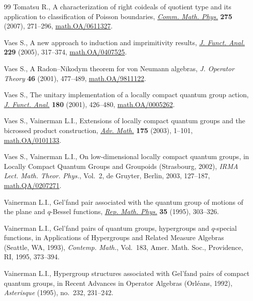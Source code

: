 \documentclass[pdftex]{sigma}
\numberwithin{equation}{section}
\theoremstyle{definition}
\begin{document}
\begin{thebibliography}{99}
 Tomatsu  R.,
  A characterization of right coideals of quotient type and its application to classif\/ication of Poisson boundaries,
\href{http://dx.doi.org/10.1007/s00220-007-0267-6}{\emph{Comm. Math. Phys.}} {\bf 275} (2007), 271--296,
\href{http://arxiv.org/abs/math.OA/0611327}{math.OA/0611327}.

    Vaes S.,
   A new approach to induction and imprimitivity results,
\href{http://dx.doi.org/10.1016/j.jfa.2004.11.016}{\emph{J. Funct. Anal.}} {\bf 229} (2005), 317--374,
\href{http://arxiv.org/abs/math.OA/0407525}{math.OA/0407525}.

  Vaes S.,
  A Radon--Nikodym theorem for von Neumann algebras,
  \emph{J. Operator Theory} {\bf 46} (2001), 477--489,
  \href{http://arxiv.org/abs/math.OA/9811122}{math.OA/9811122}.

  Vaes  S.,
    The unitary implementation of a locally compact quantum group action,
\href{http://dx.doi.org/10.1006/jfan.2000.3704}{\emph{J. Funct. Anal.}} {\bf 180} (2001), 426--480,
\href{http://arxiv.org/abs/math.OA/0005262}{math.OA/0005262}.

    Vaes S., Vainerman L.I.,
   Extensions of locally compact quantum groups and the bicrossed product construction,
\href{http://dx.doi.org/10.1016/S0001-8708(02)00040-3}{\emph{Adv. Math.}} {\bf 175} (2003), 1--101,
\href{http://arxiv.org/abs/math.OA/0101133}{math.OA/0101133}.

   Vaes  S., Vainerman L.I.,
    On low-dimensional locally compact quantum groups,
    in Locally Compact Quantum Groups and Groupoids (Strasbourg, 2002), {\it IRMA Lect. Math. Theor. Phys.}, Vol.~2, de Gruyter, Berlin, 2003, 127--187,
\href{http://arxiv.org/abs/math.QA/0207271}{math.QA/0207271}.

   Vainerman  L.I.,
    Gel'fand pair associated with the quantum group of motions of the plane and $q$-Bessel functions,
\href{http://dx.doi.org/10.1016/0034-4877(96)89291-3}{\emph{Rep. Math. Phys.}} {\bf 35} (1995), 303--326.

    Vainerman L.I.,
   Gel'fand pairs of quantum groups, hypergroups and $q$-special functions,
in Applications of Hypergroups and Related Measure Algebras (Seattle, WA, 1993), {\it  Contemp. Math.}, Vol.~183, Amer. Math. Soc., Providence, RI, 1995, 373--394.

   Vainerman  L.I.,
    Hypergroup structures associated with Gel'fand pairs of compact quantum groups,
    in  Recent Advances in Operator Algebras (Orl\'eans, 1992),
    {\it Asterisque} (1995),  no.~232, 231--242.


\end{thebibliography}
\end{document}
